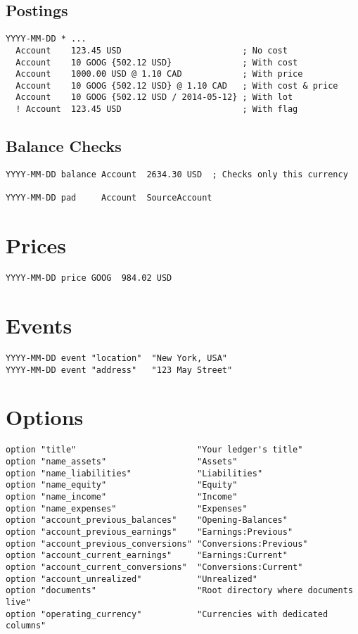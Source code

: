\documentclass[10pt,landscape]{article}
\begin{document}
\begin{multicols}{2}
\subsection{Postings}
\begin{verbatim}
YYYY-MM-DD * ...
  Account    123.45 USD                        ; No cost
  Account    10 GOOG {502.12 USD}              ; With cost
  Account    1000.00 USD @ 1.10 CAD            ; With price
  Account    10 GOOG {502.12 USD} @ 1.10 CAD   ; With cost & price
  Account    10 GOOG {502.12 USD / 2014-05-12} ; With lot
  ! Account  123.45 USD                        ; With flag
\end{verbatim}

\subsection{Balance Checks}
\begin{verbatim}
YYYY-MM-DD balance Account  2634.30 USD  ; Checks only this currency

YYYY-MM-DD pad     Account  SourceAccount
\end{verbatim}



\columnbreak

\section{Prices}
\begin{verbatim}
YYYY-MM-DD price GOOG  984.02 USD
\end{verbatim}



\section{Events}
\begin{verbatim}
YYYY-MM-DD event "location"  "New York, USA"
YYYY-MM-DD event "address"   "123 May Street"
\end{verbatim}



\section{Options}
\begin{verbatim}
option "title"                        "Your ledger's title"
option "name_assets"                  "Assets"
option "name_liabilities"             "Liabilities"
option "name_equity"                  "Equity"
option "name_income"                  "Income"
option "name_expenses"                "Expenses"
option "account_previous_balances"    "Opening-Balances"
option "account_previous_earnings"    "Earnings:Previous"
option "account_previous_conversions" "Conversions:Previous"
option "account_current_earnings"     "Earnings:Current"
option "account_current_conversions"  "Conversions:Current"
option "account_unrealized"           "Unrealized"
option "documents"                    "Root directory where documents live"
option "operating_currency"           "Currencies with dedicated columns"
\end{verbatim}




\end{multicols}
\end{document}
